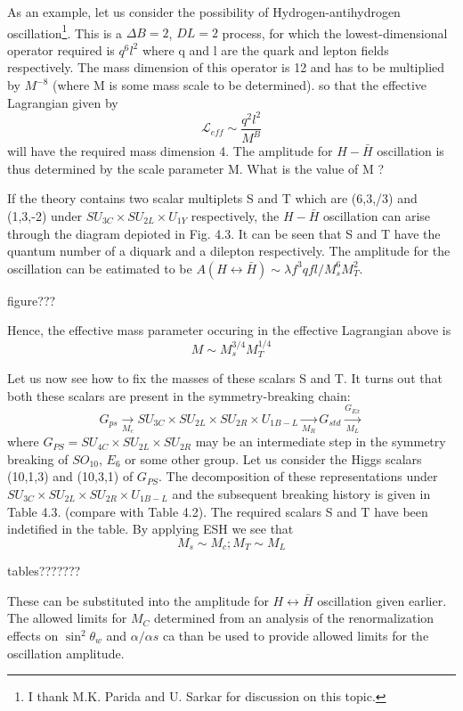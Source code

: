 As an example, let us consider the possibility of Hydrogen-antihydro\break gen oscillation\footnote{I thank M.K. Parida and U. Sarkar for discussion on this topic.}. This is a $\Delta B =2$, $D L =2$ process, for which the lowest-dimensional operator required is $q^{6}$$l^{2}$ where q and l are the quark and lepton fields respectively. The mass dimension of this operator is 12 and has to be multiplied by $M^{-8}$ (where M is some mass scale to be determined). so that the effective Lagrangian given by
$$
\mathcal{L}_{eff} \sim \frac{q^{2}l^{2}}{M^{B}}
$$
will have the required mass dimension 4. The amplitude for $H-\bar{H}$ oscillation is thus determined by the scale parameter M. What is the value of M ?

If the theory contains two scalar multiplets S and T which are (6,3,/3) and (1,3,-2) under $SU_{3C} \times SU_{2L} \times U_{1Y}$ respectively, the $H-\bar{H}$ oscillation can arise through the diagram depioted in Fig. 4.3. It can be seen that S and T have the quantum number of a diquark and a dilepton respectively. The amplitude for the oscillation can be eatimated to be $A (H \leftrightarrow \bar{H}) \sim \lambda f^{3}q fl/M^{6}_{s} M^{2}_{T}$.

figure???


Hence, the effective mass parameter occuring in the effective Lagrangian above is 
$$
M \sim M^{3/4}_{s} M^{1/4}_{T}
$$

Let us now see how to fix the masses of these scalars S and T. It turns out that both these scalars are present in the symmetry-breaking chain:
$$
G_{ps} \xrightarrow[M_{c}]{} SU_{3C} \times SU_{2L} \times SU_{2R} \times U_{1B-L}\xrightarrow[M_{R}]{} G_{std}\xrightarrow[M_{L}]{G_{Ex}}
$$
where $G_{PS} = SU_{4C} \times SU_{2L} \times SU_{2R}$ may be an intermediate step in the symmetry breaking of $SO_{10}$, $E_{6}$ or some other group. Let us consider the Higgs scalars (10,1,3) and (10,3,1) of $G_{PS}$. The decomposition of these representations under $SU_{3C} \times SU_{2L} \times SU_{2R} \times U_{1B-L}$ and the subsequent breaking history is given in Table 4.3.  (compare with Table 4.2). The required scalars S and T have been indetified in the table. By applying ESH we see that
$$
M_{s}\sim M_{c} ; M_{T}\sim M_{L}
$$

tables???????

These can be substituted into the amplitude for $H \leftrightarrow \bar{H}$ oscillation given earlier. The allowed limits for $M_{C}$ determined from an analysis of the renormalization effects on $\sin^{2}\theta_{w}$ and $\alpha/\alpha s$ ca than be used to provide allowed limits for the oscillation amplitude.

